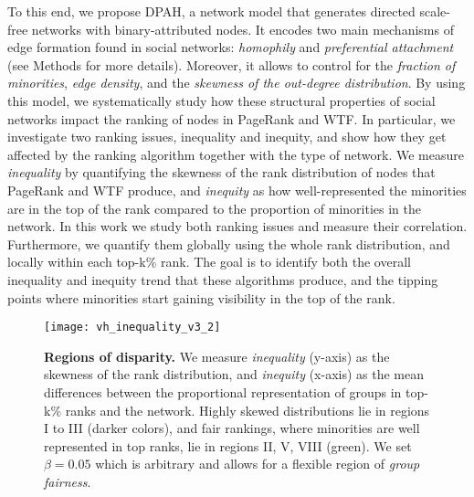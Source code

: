 \documentclass[fleqn,10pt]{wlscirep}
\begin{document}
To this end, we propose {DPAH}, a network model that generates directed scale-free networks with binary-attributed nodes.
It encodes two main mechanisms of edge formation found in social networks: \textit{homophily} and \textit{preferential attachment}~\cite{borgatti2018analyzing, mcpherson2001birds, barabasi1999emergence} (see Methods for more details).
Moreover, it allows to control for the \textit{fraction of minorities}, \textit{edge density}, and the \textit{skewness of the out-degree distribution}.
By using this model, we systematically study how these structural properties of social networks impact the ranking of nodes in PageRank and WTF. 
In particular, we investigate two ranking
issues, inequality and inequity, and show how they get affected by the ranking algorithm together with the type of network.
We measure \textit{inequality} by quantifying the skewness of the rank distribution of nodes that PageRank and WTF produce, and \textit{inequity} as how well-represented the minorities are in the top of the rank compared to the proportion of minorities in the network.
In this work we study both %
ranking issues and measure their correlation.
Furthermore, we quantify them globally using the whole rank distribution, and locally within each top-k\% rank. The goal is to identify both the overall inequality and inequity trend that these algorithms produce, and the tipping points where minorities start gaining visibility in the top of the rank.
%


\begin{figure}[t!]
    \centering
    \texttt{[image: vh\_inequality\_v3\_2]}
    \caption{\textbf{Regions of disparity.} We measure \textit{inequality} (y-axis) as the skewness of the rank distribution, and \textit{inequity} (x-axis) as the mean differences between the proportional representation of groups in top-k\% ranks and the network.
%
    Highly skewed distributions lie in regions I to III (darker colors), and fair rankings, where minorities are well represented in top ranks, lie in regions II, V, VIII (green). 
    We set $\beta=0.05$ which is arbitrary and allows for a flexible region of \textit{group fairness}.}
    \label{fig:interpretation}
\end{figure}
\end{document}
